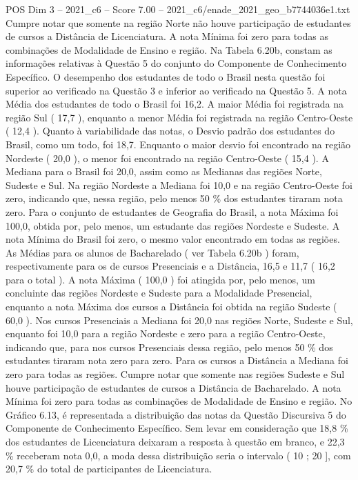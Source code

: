 \begin{textsample}{POS Dim 3 – 2021\_c6 – Score 7.00 – 2021\_c6/enade\_2021\_geo\_b7744036e1.txt}
Cumpre notar que somente na região Norte não houve participação de estudantes de cursos a Distância de Licenciatura.
A nota Mínima foi zero para todas as combinações de Modalidade de Ensino e região.
Na Tabela 6.20b, constam as informações relativas à Questão 5 do conjunto do Componente de Conhecimento Específico.
O desempenho dos estudantes de todo o Brasil nesta questão foi superior ao verificado na Questão 3 e inferior ao verificado na Questão 5.
A nota Média dos estudantes de todo o Brasil foi 16,2.
A maior Média foi registrada na região Sul ( 17,7 ), enquanto a menor Média foi registrada na região Centro-Oeste ( 12,4 ).
Quanto à variabilidade das notas, o Desvio padrão dos estudantes do Brasil, como um todo, foi 18,7.
Enquanto o maior desvio foi encontrado na região Nordeste ( 20,0 ), o menor foi encontrado na região Centro-Oeste ( 15,4 ).
A Mediana para o Brasil foi 20,0, assim como as Medianas das regiões Norte, Sudeste e Sul.
Na região Nordeste a Mediana foi 10,0 e na região Centro-Oeste foi zero, indicando que, nessa região, pelo menos 50 \% dos estudantes tiraram nota zero.
Para o conjunto de estudantes de Geografia do Brasil, a nota Máxima foi 100,0, obtida por, pelo menos, um estudante das regiões Nordeste e Sudeste.
A nota Mínima do Brasil foi zero, o mesmo valor encontrado em todas as regiões.
As Médias para os alunos de Bacharelado ( ver Tabela 6.20b ) foram, respectivamente para os de cursos Presenciais e a Distância, 16,5 e 11,7 ( 16,2 para o total ).
A nota Máxima ( 100,0 ) foi atingida por, pelo menos, um concluinte das regiões Nordeste e Sudeste para a Modalidade Presencial, enquanto a nota Máxima dos cursos a Distância foi obtida na região Sudeste ( 60,0 ).
Nos cursos Presenciais a Mediana foi 20,0 nas regiões Norte, Sudeste e Sul, enquanto foi 10,0 para a região Nordeste e zero para a região Centro-Oeste, indicando que, para nos cursos Presenciais dessa região, pelo menos 50 \% dos estudantes tiraram nota zero para zero.
Para os cursos a Distância a Mediana foi zero para todas as regiões.
Cumpre notar que somente nas regiões Sudeste e Sul houve participação de estudantes de cursos a Distância de Bacharelado.
A nota Mínima foi zero para todas as combinações de Modalidade de Ensino e região.
No Gráfico 6.13, é representada a distribuição das notas da Questão Discursiva 5 do Componente de Conhecimento Específico.
Sem levar em consideração que 18,8 \% dos estudantes de Licenciatura deixaram a resposta à questão em branco, e 22,3 \% receberam nota 0,0, a moda dessa distribuição seria o intervalo ( 10 ; 20 ], com 20,7 \% do total de participantes de Licenciatura.

\end{textsample}
